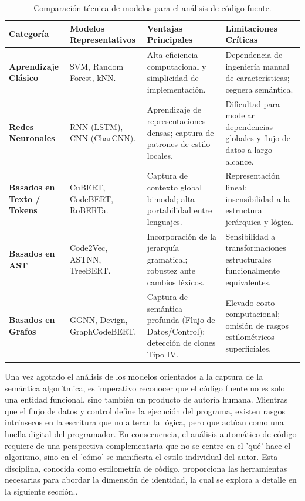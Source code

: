 \begin{table}[H]
\centering
\caption{Comparación técnica de modelos para el análisis de código fuente.}
\label{tab:comparativa_modelos}
\small
\begin{tabularx}{\textwidth}{|p{2.5cm}|X|X|X|}
\hline
\textbf{Categoría} & \textbf{Modelos Representativos} & \textbf{Ventajas Principales} & \textbf{Limitaciones Críticas} \\ \hline
\textbf{Aprendizaje Clásico} & SVM, Random Forest, kNN. & Alta eficiencia computacional y simplicidad de implementación. & Dependencia de ingeniería manual de características; ceguera semántica. \\ \hline
\textbf{Redes Neuronales} & RNN (LSTM), CNN (CharCNN). & Aprendizaje de representaciones densas; captura de patrones de estilo locales. & Dificultad para modelar dependencias globales y flujo de datos a largo alcance. \\ \hline
\textbf{Basados en Texto / Tokens} & CuBERT, CodeBERT, RoBERTa. & Captura de contexto global bimodal; alta portabilidad entre lenguajes. & Representación lineal; insensibilidad a la estructura jerárquica y lógica. \\ \hline
\textbf{Basados en AST} & Code2Vec, ASTNN, TreeBERT. & Incorporación de la jerarquía gramatical; robustez ante cambios léxicos. & Sensibilidad a transformaciones estructurales funcionalmente equivalentes. \\ \hline
\textbf{Basados en Grafos} & GGNN, Devign, GraphCodeBERT. & Captura de semántica profunda (Flujo de Datos/Control); detección de clones Tipo IV. & Elevado costo computacional; omisión de rasgos estilométricos superficiales. \\ \hline
\end{tabularx}
\end{table}

Una vez agotado el análisis de los modelos orientados a la captura de la semántica algorítmica, es imperativo reconocer que el código fuente no es solo una entidad funcional, sino también un producto de autoría humana. Mientras que el flujo de datos y control define la ejecución del programa, existen rasgos intrínsecos en la escritura que no alteran la lógica, pero que actúan como una huella digital del programador. En consecuencia, el análisis automático de código requiere de una perspectiva complementaria que no se centre en el 'qué' hace el algoritmo, sino en el 'cómo' se manifiesta el estilo individual del autor. Esta disciplina, conocida como estilometría de código, proporciona las herramientas necesarias para abordar la dimensión de identidad, la cual se explora a detalle en la siguiente sección..

